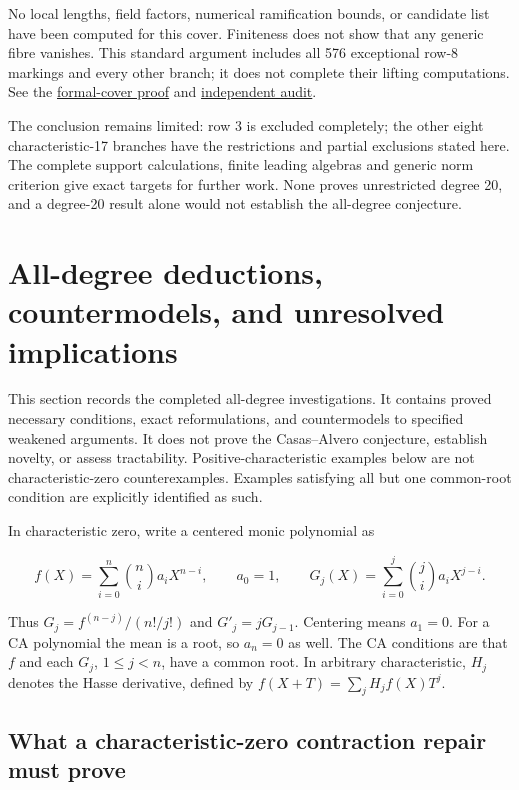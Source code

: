 \documentclass[
  british,
  10pt,
]{article}
\begin{document}
No local lengths, field factors, numerical ramification bounds, or
candidate list have been computed for this cover. Finiteness does not
show that any generic fibre vanishes. This standard argument includes
all 576 exceptional row-8 markings and every other branch; it does not
complete their lifting computations. See the
\href{evidence/full/wild17/blowup/COLLECTIVE_REDUCTION.md}{formal-cover
proof} and
\href{evidence/full/wild17/blowup/COLLECTIVE_REDUCTION_AUDIT.md}{independent
audit}.

The conclusion remains limited: row 3 is excluded completely; the other
eight characteristic-17 branches have the restrictions and partial
exclusions stated here. The complete support calculations, finite
leading algebras and generic norm criterion give exact targets for
further work. None proves unrestricted degree 20, and a degree-20 result
alone would not establish the all-degree conjecture.

\section{All-degree deductions, countermodels, and unresolved
implications}\label{all-degree-deductions-countermodels-and-unresolved-implications}

This section records the completed all-degree investigations. It
contains proved necessary conditions, exact reformulations, and
countermodels to specified weakened arguments. It does not prove the
Casas--Alvero conjecture, establish novelty, or assess tractability.
Positive-characteristic examples below are not characteristic-zero
counterexamples. Examples satisfying all but one common-root condition
are explicitly identified as such.

In characteristic zero, write a centered monic polynomial as

\[
 f(X)=\sum_{i=0}^n\binom ni a_iX^{n-i},\qquad a_0=1,
 \qquad G_j(X)=\sum_{i=0}^j\binom ji a_iX^{j-i}.
\]

Thus \(G_j=f^{(n-j)}/(n!/j!)\) and \(G'_j=jG_{j-1}\). Centering means
\(a_1=0\). For a CA polynomial the mean is a root, so \(a_n=0\) as well.
The CA conditions are that \(f\) and each \(G_j\), \(1\le j<n\), have a
common root. In arbitrary characteristic, \(H_j\) denotes the Hasse
derivative, defined by \(f(X+T)=\sum_jH_jf(X)T^j\).

\subsection{What a characteristic-zero contraction repair must
prove}\label{what-a-characteristic-zero-contraction-repair-must-prove}
\end{document}
